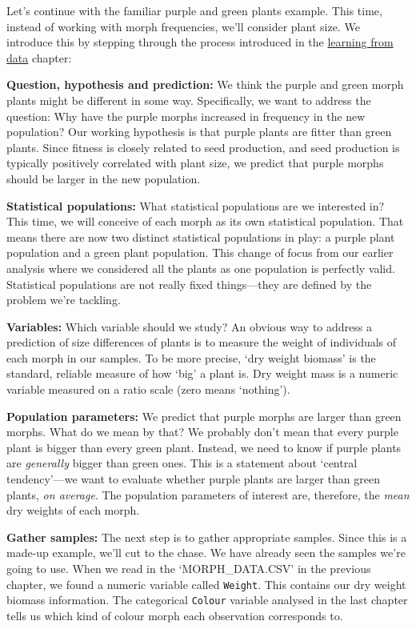 \documentclass[
]{book}
\begin{document}
Let's continue with the familiar purple and green plants example. This time, instead of working with morph frequencies, we'll consider plant size. We introduce this by stepping through the process introduced in the \protect\hyperlink{learning-from-data}{learning from data} chapter:

\textbf{Question, hypothesis and prediction:} We think the purple and green morph plants might be different in some way. Specifically, we want to address the question: Why have the purple morphs increased in frequency in the new population? Our working hypothesis is that purple plants are fitter than green plants. Since fitness is closely related to seed production, and seed production is typically positively correlated with plant size, we predict that purple morphs should be larger in the new population.

\textbf{Statistical populations:} What statistical populations are we interested in? This time, we will conceive of each morph as its own statistical population. That means there are now two distinct statistical populations in play: a purple plant population and a green plant population. This change of focus from our earlier analysis where we considered all the plants as one population is perfectly valid. Statistical populations are not really fixed things---they are defined by the problem we're tackling.

\textbf{Variables:} Which variable should we study? An obvious way to address a prediction of size differences of plants is to measure the weight of individuals of each morph in our samples. To be more precise, `dry weight biomass' is the standard, reliable measure of how `big' a plant is. Dry weight mass is a numeric variable measured on a ratio scale (zero means `nothing').

\textbf{Population parameters:} We predict that purple morphs are larger than green morphs. What do we mean by that? We probably don't mean that every purple plant is bigger than every green plant. Instead, we need to know if purple plants are \emph{generally} bigger than green ones. This is a statement about `central tendency'---we want to evaluate whether purple plants are larger than green plants, \emph{on average}. The population parameters of interest are, therefore, the \emph{mean} dry weights of each morph.

\textbf{Gather samples:} The next step is to gather appropriate samples. Since this is a made-up example, we'll cut to the chase. We have already seen the samples we're going to use. When we read in the `MORPH\_DATA.CSV' in the previous chapter, we found a numeric variable called \texttt{Weight}. This contains our dry weight biomass information. The categorical \texttt{Colour} variable analysed in the last chapter tells us which kind of colour morph each observation corresponds to.
\end{document}
